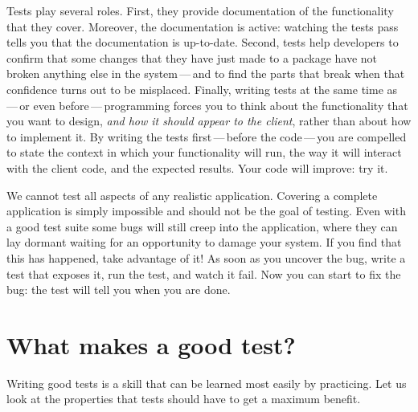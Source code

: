 \documentclass[a4paper,10pt,twoside]{book}
\begin{document}
Tests play several roles. First, they provide documentation of the functionality that they cover.  
Moreover, the documentation is active: watching the tests pass tells you that the documentation is up-to-date.
Second,
tests help developers to confirm that some changes that they have just made to a package
have not broken anything else in the system\,---\,and to find the parts that break when that confidence turns out to be misplaced.
Finally, writing tests at the same time as\,---\,or even
before\,---\,programming forces you to think about the functionality
that you want to design, \emph{and how it should appear to the client}, 
rather than about how to implement it.
By writing the tests first\,---\,before the code\,---\,you are compelled to state
the context in which your functionality will run, the way it will
interact with the client code, and the expected results.  
Your code will improve: try it.


We cannot test all aspects of any realistic application.
Covering a complete application is simply impossible and should not be the
goal of testing. 
Even with a good test suite
some bugs will still creep into the application, where they can lay dormant
waiting for an opportunity to damage your system.  
If you find that this has happened, take advantage of it!
As soon as you uncover the bug, write a test that exposes it, run the test, and watch it fail.
Now you can start to fix the bug: the test will tell you when you are done.
\section{What makes a good test?}

Writing good tests is a skill that can be learned most easily by
practicing.  Let us look at the properties that tests should have to
get a maximum benefit.
\end{document}
